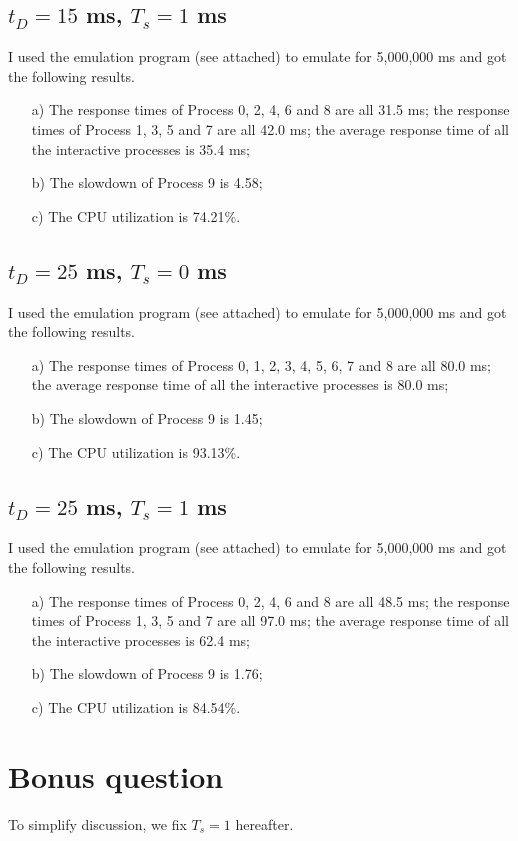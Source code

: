\documentclass[12pt,letterpaper]{article}
\begin{document}
\subsection{$t_D=15$ ms, $T_s = 1$ ms}
I used the emulation program (see attached) to emulate for 5,000,000 ms and got the following results.
\begin{enumerate}
\item[a)] The response times of Process 0, 2, 4, 6 and 8 are all 31.5 ms; the response times of Process 1, 3, 5 and 7 are all 42.0 ms; the average response time of all the interactive processes is 35.4 ms;
\item[b)] The slowdown of Process 9 is 4.58;
\item[c)] The CPU utilization is 74.21\%.
\end{enumerate}

\subsection{$t_D=25$ ms, $T_s = 0$ ms}
I used the emulation program (see attached) to emulate for 5,000,000 ms and got the following results.
\begin{enumerate}
\item[a)] The response times of Process 0, 1, 2, 3, 4, 5, 6, 7 and 8 are all 80.0 ms; the average response time of all the interactive processes is 80.0 ms;
\item[b)] The slowdown of Process 9 is 1.45;
\item[c)] The CPU utilization is 93.13\%.
\end{enumerate}

\subsection{$t_D=25$ ms, $T_s = 1$ ms}
I used the emulation program (see attached) to emulate for 5,000,000 ms and got the following results.
\begin{enumerate}
\item[a)] The response times of Process 0, 2, 4, 6 and 8 are all 48.5 ms; the response times of Process 1, 3, 5 and 7 are all 97.0 ms; the average response time of all the interactive processes is 62.4 ms;
\item[b)] The slowdown of Process 9 is 1.76;
\item[c)] The CPU utilization is 84.54\%.
\end{enumerate}

\section{Bonus question}
To simplify discussion, we fix $T_s = 1$ hereafter.
\end{document}
